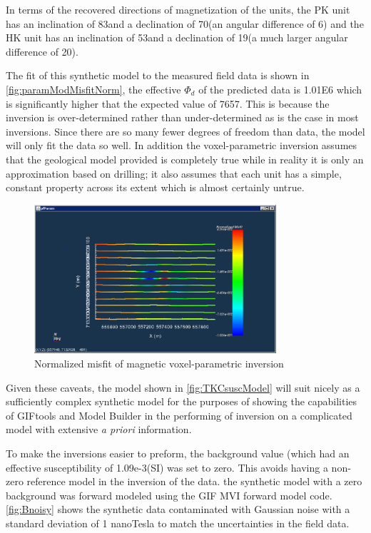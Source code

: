 In terms of the recovered directions of magnetization of the units, the PK unit has an inclination of 83\degree and a declination of 70\degree (an angular difference of 6\degree) and the HK unit has an inclination of 53\degree and a declination of 19\degree (a much larger angular difference of 20\degree).


The fit of this synthetic model to the measured field data is shown in  \autoref{fig:paramModMisfitNorm}, the effective $\Phi_d$ of the predicted data is 
1.01E6 which is significantly higher that the expected value of 7657. This is because the inversion is over-determined rather than under-determined as is the case in most inversions. Since there are so many fewer degrees of freedom than data, the model will only fit the data so well. In addition the voxel-parametric inversion assumes that the geological model provided is completely true while in reality it is only an approximation based on drilling; it also assumes that each unit has a simple, constant property across its extent which is almost certainly untrue.

\begin{figure} [h]
   \centering
   \includegraphics[width=0.8\textwidth]{images/TKC/paramModMisfitNorm.PNG}
   \caption{Normalized misfit of magnetic voxel-parametric  inversion}
   \label{fig:paramModMisfitNorm}
\end{figure}

Given these caveats, the model shown in \autoref{fig:TKCsuscModel} will suit nicely as a sufficiently complex synthetic model for the purposes of showing the capabilities of GIFtools and Model Builder in the performing of inversion on a complicated model with extensive \emph{a priori} information.

To make the inversions easier to preform, the background value (which had an effective susceptibility of 1.09e-3(SI) was set to zero. This avoids having a non-zero reference model in the inversion of the data. the synthetic model with a zero background was forward modeled using the \ac{GIF} \ac{MVI} forward model code. \autoref{fig:Bnoisy} shows the synthetic data contaminated with Gaussian noise with a standard deviation of 1 nanoTesla to match the uncertainties in the field data.

